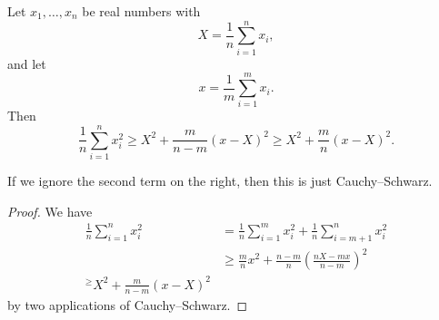\documentclass[a4paper]{article}
\begin{document}
\begin{lemma}
  Let $x_1, \ldots, x_n$ be real numbers with
  \[
    X = \frac{1}{n} \sum_{i = 1}^n x_i,
  \]
  and let
  \[
    x = \frac{1}{m} \sum_{i = 1}^m x_i.
  \]
  Then
  \[
    \frac{1}{n} \sum_{i = 1}^n x_i^2 \geq X^2 + \frac{m}{n - m}(x - X)^2 \geq X^2 + \frac{m}{n} (x - X)^2.
  \]
\end{lemma}
If we ignore the second term on the right, then this is just Cauchy--Schwarz.

\begin{proof}
  We have
  \begin{align*}
    \frac{1}{n} \sum_{i = 1}^n x_i^2 &= \frac{1}{n} \sum_{i = 1}^m x_i^2 + \frac{1}{n} \sum_{i = m + 1}^n x_i^2 \\
    &\geq \frac{m}{n} x^2 + \frac{n - m}{n} \left(\frac{nX - mx}{n - m}\right)^2\\
    ^\geq X^2 + \frac{m}{n - m} (x - X)^2
  \end{align*}
  by two applications of Cauchy--Schwarz.
\end{proof}
\end{document}
